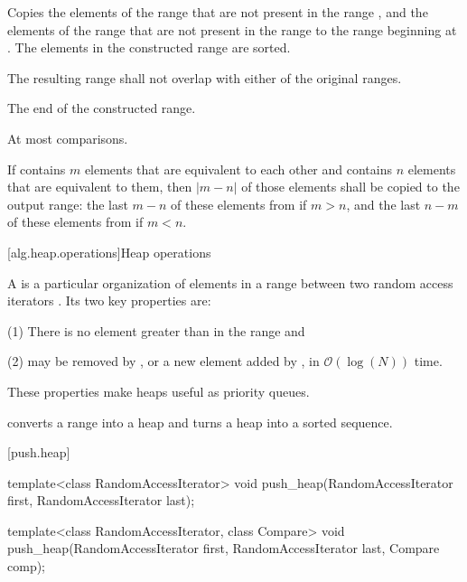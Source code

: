 \begin{itemdescr}
\pnum
\effects
Copies the elements of the range
that are not present in the range
,
and the elements of the range
that are not present in the range
to the range beginning at
.
The elements in the constructed range are sorted.

\pnum
\requires
The resulting range shall not overlap with either of the original ranges.

\pnum
\returns
The end of the constructed range.

\pnum
\complexity
At most
comparisons.

\pnum
\notes
If  contains $m$ elements that are equivalent to each other and
 contains $n$ elements that are equivalent to them, then
$|m - n|$ of those elements shall be copied to the output range: the last
$m - n$ of these elements from  if $m > n$, and the last
$n - m$ of these elements from  if $m < n$.
\end{itemdescr}

[alg.heap.operations]{Heap operations}

\pnum
A
is a particular organization of elements in a range between two random access iterators
.
Its two key properties are:

\begin{description}
\item{(1)} There is no element greater than
in the range and
\item{(2)} 
may be removed by
,
or a new element added by
,
in
$\mathcal{O}(\log(N))$
time.
\end{description}

\pnum
These properties make heaps useful as priority queues.

\pnum
{}
converts a range into a heap and
turns a heap into a sorted sequence.

[push.heap]{}

%
\begin{itemdecl}
template<class RandomAccessIterator>
  void push_heap(RandomAccessIterator first, RandomAccessIterator last);

template<class RandomAccessIterator, class Compare>
  void push_heap(RandomAccessIterator first, RandomAccessIterator last,
                 Compare comp);
\end{itemdecl}

